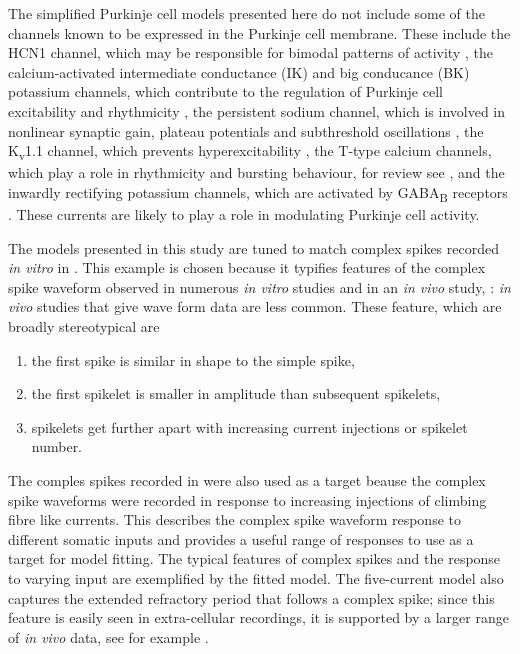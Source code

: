 \documentclass[twocolumn]{svjour3}          %
\begin{document}
The simplified Purkinje cell models presented here do not include some
of the channels known to be expressed in the Purkinje cell
membrane. These include the HCN1 channel, which may be responsible for
bimodal patterns of activity \citep{LoewensteinEtAl2005}, the
calcium-activated intermediate conductance (IK) and big conducance
(BK) potassium channels, which contribute to the regulation of
Purkinje cell excitability and rhythmicity \citep{CheronEtAl2009}, the
persistent sodium channel, which is involved in nonlinear synaptic
gain, plateau potentials and subthreshold oscillations
\citep{KayEtAl1998}, the K\textsubscript{v}1.1 channel, which prevents
hyperexcitability \citep{ZhangEtAl1999}, the T-type calcium channels,
which play a role in rhythmicity and bursting behaviour, for review
see \citet{CainSnutch2010}, and the inwardly rectifying potassium
channels, which are activated by GABA\textsubscript{B} receptors
\citep{TabataEtAl2005}. These currents are likely to play a role in
modulating Purkinje cell activity.


The models presented in this study are tuned to match complex spikes
recorded \textsl{in vitro} in \citet{DavieEtAl2008}. This example is
chosen because it typifies features of the complex spike
waveform observed in numerous \textsl{in vitro} studies
\citep{ZaghaEtAl2008,zhang2017ethanol,MonsivaisEtAl2005,khaliq2005axonal} and in an \textsl{in vivo} study, \citet{WarnaarEtAl2015}:
\textsl{in vivo} studies that give wave form data are less common. These feature, which are broadly
stereotypical are
\begin{enumerate}
\item the first spike is similar in shape to the simple spike,
\item the first spikelet is smaller in amplitude than subsequent spikelets,
\item spikelets get further apart with increasing current injections or spikelet number.
\end{enumerate}
The comples spikes recorded in \citet{DavieEtAl2008} were also used as
a target beause the complex spike waveforms were recorded in response
to increasing injections of climbing fibre like currents. This
describes the complex spike waveform response to different somatic
inputs and provides a useful range of responses to use as a target for
model fitting. The typical features of complex spikes and the response
to varying input are exemplified by the fitted model. The five-current
model also captures the extended refractory period that follows a
complex spike; since this feature is easily seen in extra-cellular
recordings, it is supported by a larger range of \textsl{in vivo}
data, see for example
\citet{GranitPhillips1956,LathamPaul1970,BloedelRoberts1971,ArmstrongRawson1979,BausweinEtAl1983,SatoEtAl1992,BurroughsEtAl2016}.
\end{document}
